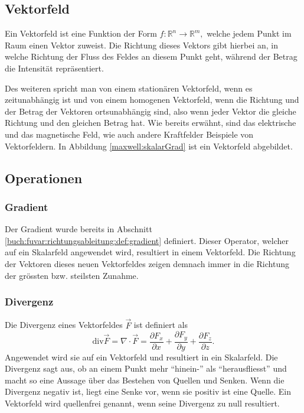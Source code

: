 \subsection{Vektorfeld\label{maxwell:vektorfeld}}

Ein Vektorfeld ist eine Funktion der Form \( f: \mathbb{R}^n \rightarrow \mathbb{R}^m, \) welche jedem Punkt im Raum einen Vektor zuweist. 
Die Richtung dieses Vektors gibt hierbei an, in welche Richtung der Fluss des Feldes an diesem Punkt geht, während der Betrag die Intensität repräsentiert.


Des weiteren spricht man von einem stationären Vektorfeld, wenn es zeitunabhängig ist und von einem homogenen Vektorfeld, wenn die Richtung und der Betrag der Vektoren ortsunabhängig sind, also wenn jeder Vektor die gleiche Richtung und den gleichen Betrag hat. 
Wie bereits erwähnt, sind das elektrische und das magnetische Feld, wie auch andere Kraftfelder Beispiele von Vektorfeldern.
In Abbildung \ref{maxwell:skalarGrad} ist ein Vektorfeld abgebildet.

\subsection{Operationen}

\subsubsection{Gradient}

Der Gradient wurde bereits in Abschnitt \ref{buch:fuvar:richtungsableitung:def:gradient} definiert. Dieser Operator, welcher auf ein Skalarfeld angewendet wird, resultiert in einem Vektorfeld. 
Die Richtung der Vektoren dieses neuen Vektorfeldes zeigen demnach immer in die Richtung der grössten bzw. steilsten Zunahme.

\subsubsection{Divergenz}
Die Divergenz eines Vektorfeldes $\vec{F}$ ist definiert als 
\[ \text{div}\vec{F} = \nabla\cdot\vec{F} 
= \frac{\partial F_x}{\partial x} + \frac{\partial F_y}{\partial y} + \frac{\partial F_z}{\partial z}. \]
Angewendet wird sie auf ein Vektorfeld und resultiert in ein Skalarfeld.
Die Divergenz sagt aus, ob an einem Punkt mehr ``hinein-'' als ``herausfliesst'' und macht so eine Aussage über das Bestehen von Quellen und Senken. 
Wenn die Divergenz negativ ist, liegt eine Senke vor, wenn sie positiv ist eine Quelle.
Ein Vektorfeld wird quellenfrei genannt, wenn seine Divergenz zu null resultiert.

